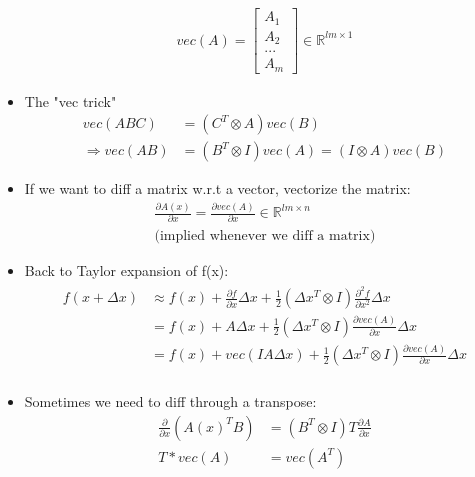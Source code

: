 \begin{itemize}
\begin{align}
        vec(A) = \begin{bmatrix}
            A_1 \\ A_2 \\ ... \\ A_m
        \end{bmatrix} \in \mathbb{R}^{lm \times 1}
    \end{align}
    \item The "vec trick"
    \begin{align}
        vec(ABC) & = (C^T \otimes A) vec(B) \\
        \Rightarrow vec(AB) & = (B^T \otimes I) vec(A) = (I \otimes A) vec(B)
    \end{align}
    \item If we want to diff a matrix w.r.t a vector, vectorize the matrix:
    \begin{align}
        \frac{\partial A(x)}{\partial x} = \frac{\partial vec(A)}{\partial x} \in \mathbb{R}^{lm \times n} \\
        \text{(implied whenever we diff a matrix)}
    \end{align}
    \item Back to Taylor expansion of f(x):
    \begin{align}
        \begin{split}
        f(x + \Delta x) & \approx f(x) + \frac{\partial f}{\partial x} \Delta x + \frac{1}{2} (\Delta x^T \otimes I) \frac{\partial^2 f}{\partial x^2} \Delta x \\
        & = f(x) + A \Delta x + \frac{1}{2} (\Delta x^T \otimes I) \frac{\partial vec(A)}{\partial x} \Delta x \\
        & = f(x) + vec(IA \Delta x) + \frac{1}{2} (\Delta x^T \otimes I) \frac{\partial vec(A)}{\partial x} \Delta x \\
        \end{split}
    \end{align}
    \item Sometimes we need to diff through a transpose:
    \begin{align}
        \frac{\partial}{\partial x} (A(x)^T B) & = (B^T \otimes I) T \frac{\partial A}{\partial x} \\
        T * vec(A) & = vec(A^T)
    \end{align}
\end{itemize}

